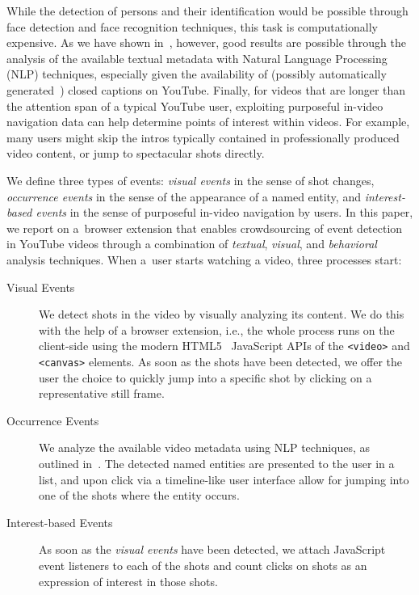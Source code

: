 \documentclass[runningheads,a4paper]{llncs}
\begin{document}
While the detection of persons and their identification would be possible through face detection and face recognition techniques, this task is computationally expensive. As we have shown in~\cite{semwebvid}, however, good results are possible through the analysis of the available textual metadata with Natural Language Processing (NLP) techniques, especially given the availability of (possibly automatically generated~\cite{youtubecaptions}) closed captions on YouTube. Finally, for videos that are longer than the attention span of a typical YouTube user, exploiting purposeful in-video navigation data can help determine points of interest within videos. For example, many users might skip the intros typically contained in professionally produced video content, or jump to spectacular shots directly. 

We define three types of events: \emph{visual events} in the sense of shot changes, \emph{occurrence events} in the sense of the appearance of a named entity, and \emph{interest-based events} in the sense of purposeful in-video navigation by users. In this paper, we report on a~browser extension that enables crowdsourcing  of event detection in YouTube videos through a combination of \emph{textual}, \emph{visual}, and \emph{behavioral} analysis techniques. When a~user starts watching a video, three processes start:

\begin{description}
  \item[Visual Events] We detect shots in the video by visually analyzing its content. We do this with the help of a browser extension, i.e., the whole process runs on the client-side using the modern HTML5~\cite{w3c_html5} JavaScript APIs of the \texttt{<video>} and \texttt{<canvas>} elements. As soon as the shots have been detected, we offer the user the choice to quickly jump into a specific shot by clicking on a representative still frame. 
  \item[Occurrence Events] We analyze the available video metadata using NLP techniques, as outlined in~\cite{semwebvid}. The detected named entities are presented to the user in a list, and upon click via a timeline-like user interface allow for jumping into one of the shots where the entity occurs.
  \item[Interest-based Events] As soon as the \emph{visual events} have been detected, we attach JavaScript event listeners to each of the shots and count clicks on shots as an expression of interest in those shots.
\end{description} 
 
\end{document}
